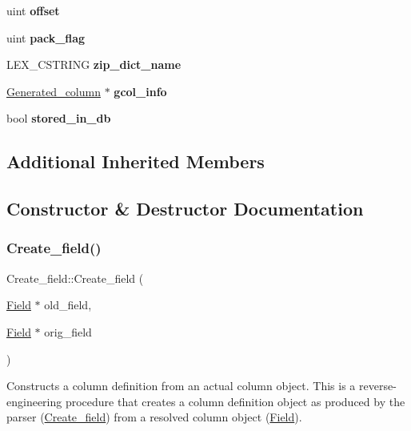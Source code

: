 \begin{DoxyCompactItemize}
uint {\bfseries offset}
\item 
\mbox{\label{classCreate__field_a0ededf0d0a4799cdf952f9786fe2b1be}} 
uint {\bfseries pack\+\_\+flag}
\item 
\mbox{\label{classCreate__field_afb58d227c0cabbf890c5f98eeb68983a}} 
L\+E\+X\+\_\+\+C\+S\+T\+R\+I\+NG {\bfseries zip\+\_\+dict\+\_\+name}
\item 
\mbox{\label{classCreate__field_aca4810b43a332f25fd0c5ca9d26d222d}} 
\mbox{\hyperlink{classGenerated__column}{Generated\+\_\+column}} $\ast$ {\bfseries gcol\+\_\+info}
\item 
\mbox{\label{classCreate__field_a10cd6f900810faf998ee708d109187a1}} 
bool {\bfseries stored\+\_\+in\+\_\+db}
\end{DoxyCompactItemize}
\subsection*{Additional Inherited Members}


\subsection{Constructor \& Destructor Documentation}
\mbox{\label{classCreate__field_a9b04b8a7ff95d34b23212320d24cc06e}} 
\subsubsection{\texorpdfstring{Create\+\_\+field()}{Create\_field()}}
{\footnotesize\ttfamily Create\+\_\+field\+::\+Create\+\_\+field (\begin{DoxyParamCaption}\item[{\mbox{\hyperlink{classField}{Field}} $\ast$}]{old\+\_\+field,  }\item[{\mbox{\hyperlink{classField}{Field}} $\ast$}]{orig\+\_\+field }\end{DoxyParamCaption})}

Constructs a column definition from an actual column object. This is a reverse-\/engineering procedure that creates a column definition object as produced by the parser (\mbox{\hyperlink{classCreate__field}{Create\+\_\+field}}) from a resolved column object (\mbox{\hyperlink{classField}{Field}}).


